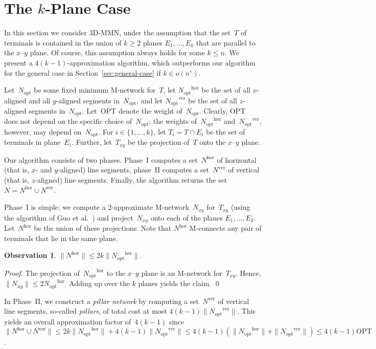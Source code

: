 \documentclass[11pt]{llncs}
\newcommand{\Nopt}{\ensuremath{N_\mathrm{opt}}\xspace}
\newcommand{\Nhor}{\ensuremath{N^\mathrm{hor}}\xspace}
\newcommand{\Nver}{\ensuremath{N^\mathrm{ver}}\xspace}
\newcommand{\Nopthor}{\ensuremath{\Nopt^\mathrm{hor}}\xspace}
\newcommand{\Noptver}{\ensuremath{\Nopt^\mathrm{ver}}\xspace}
\newcommand{\Nxy}{\ensuremath{N_{xy}}\xspace}
\newcommand{\Txy}{\ensuremath{T_{xy}}\xspace}
\newcommand{\eps}{\ensuremath{\varepsilon}\xspace}
\newcommand{\opt}{\ensuremath{\mathrm{OPT}}\xspace}
\newcommand{\etal}{et al.}
\newtheorem{observation}{Observation}
\newenvironment{pf}{\begin{proof}}{\qed\end{proof}}
\begin{document}
\section{The $k$-Plane Case}
\label{sec:k-planes}

In this section we consider 3D-MMN, under the assumption that the
set~$T$ of terminals is contained in the union of $k \ge 2$ planes
$E_1,\dots, E_k$ that are parallel to the $x$--$y$ plane.  Of course,
this assumption always holds for some $k \le n$.  We present a
$4(k-1)$-approximation algorithm, which outperforms our algorithm for
the general case in Section~\ref{sec:general-case} if $k \in
o(n^\eps)$.  

Let~\Nopt be some fixed minimum M-network for~$T$, let \Nopthor be the
set of all $x$-aligned and all $y$-aligned segments in~\Nopt, and let
\Noptver be the set of all $z$-aligned segments in~\Nopt.  Let~\opt
denote the weight of~\Nopt.  Clearly, \opt does not depend on the
specific choice of~\Nopt; the weights of~\Nopthor and~\Noptver,
however, may depend on~\Nopt. For $i \in \{1,\dots,k\}$, let $T_i =
T \cap E_i$ be the set of terminals in plane~$E_i$.  Further, let~\Txy
be the projection of~$T$ onto the $x$--$y$ plane. 

Our algorithm consists of two phases.  Phase~I computes a set~\Nhor of
horizontal (that is, $x$- and $y$-aligned) line segments, phase~II
computes a set~\Nver of vertical (that is, $z$-aligned) line segments.
Finally, the algorithm returns the set $N = \Nhor \cup \Nver$. 

Phase~I is simple; we compute a 2-approximate M-network~\Nxy for~\Txy
(using the algorithm of Guo \etal~\cite{gsz-yaa2a-08}) and
project~\Nxy onto each of the planes $E_1,\dots, E_k$.  Let~\Nhor be the union of
these projections.  Note that \Nhor M-connects any pair of terminals
that lie in the same plane.
\begin{observation}
  \label{obs:Nhor}
  $\| \Nhor \| \le 2k\|\Nopthor\|$.
\end{observation}
\begin{pf}
  The projection of~\Nopthor to the $x$--$y$ plane is an M-network
  for~\Txy.  Hence, $\|\Nxy\| \le 2 \Nopthor$.  Adding up over the $k$
  planes yields the claim.
\end{pf}
In Phase~II, we construct a {\em pillar network} by computing a set~\Nver of
vertical line segments, so-called \emph{pillars}, of total cost at
most $4(k-1)\|\Noptver\|$.  This yields an overall approximation
factor of~$4(k-1)$ since $\|\Nhor \cup \Nver\| \le 2k\|\Nopthor\| +
4(k-1)\|\Noptver\| \le 4(k-1) (\|\Nopthor\| + \|\Noptver\|) \le 4(k-1)
\opt$.
\end{document}
